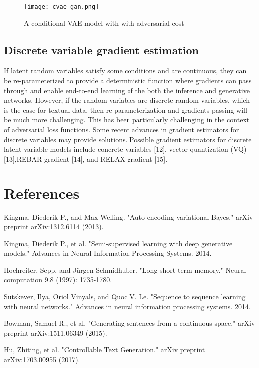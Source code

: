\documentclass[a4paper]{article}
\begin{document}
\begin{figure}
\centering
\texttt{[image: cvae\_gan.png]}
\caption{\label{fig:cvae_gan}A conditional VAE model with with adversarial cost}
\end{figure}


\subsection{Discrete variable gradient estimation}
If latent random variables satisfy some conditions and are continuous, they can be re-parameterized to provide a deterministic function where gradients can pass through and enable end-to-end learning of the both the inference and generative networks. However, if the random variables are discrete random variables, which is the case for textual data, then re-parameterization and gradients passing will be much more challenging. This has been particularly challenging in the context of adversarial loss functions. Some recent advances in gradient estimators for discrete variables may provide solutions. Possible gradient estimators for discrete latent variable models include concrete variables [12], vector quantization (VQ) [13],REBAR gradient [14], and RELAX gradient [15]. 


\section{References}

\noindent [1] Kingma, Diederik P., and Max Welling. "Auto-encoding variational Bayes." arXiv preprint arXiv:1312.6114 (2013).

\noindent [2] Kingma, Diederik P., et al. "Semi-supervised learning with deep generative models." Advances in Neural Information Processing Systems. 2014.

\noindent [3] Hochreiter, Sepp, and Jürgen Schmidhuber. "Long short-term memory." Neural computation 9.8 (1997): 1735-1780.

\noindent [4] Sutskever, Ilya, Oriol Vinyals, and Quoc V. Le. "Sequence to sequence learning with neural networks." Advances in neural information processing systems. 2014.

\noindent [5] Bowman, Samuel R., et al. "Generating sentences from a continuous space." arXiv preprint arXiv:1511.06349 (2015).

\noindent [6] Hu, Zhiting, et al. "Controllable Text Generation." arXiv preprint arXiv:1703.00955 (2017).
\end{document}
